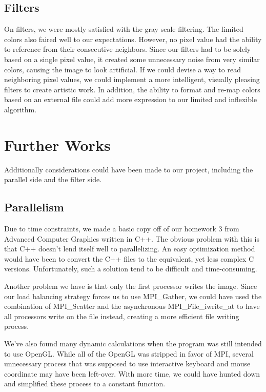 \documentclass{acmsiggraph}
\begin{document}
\subsection{Filters}
On filters, we were mostly satisfied with the gray scale filtering.  The
limited colors also faired well to our expectations. However, no pixel value had
the ability to reference from their consecutive neighbors.  Since our filters had
to be solely based on a single pixel value, it created some unnecessary noise from
very similar colors, causing the image to look artificial.  If we could devise a
way to read neighboring pixel values, we could implement a more intelligent,
visually pleasing filters to create artistic work.  In addition, the ability
to format and re-map colors based on an external file could add more expression
to our limited and inflexible algorithm.


\section{Further Works}
Additionally considerations could have been made to our project, including the
parallel side and the filter side.

\subsection{Parallelism}
Due to time constraints, we made a basic copy off of our homework 3 from
Advanced Computer Graphics written in C++.  The obvious problem with this is
that C++ doesn't lend itself well to parallelizing.  An easy optimization method
would have been to convert the C++ files to the equivalent, yet less complex C
versions.  Unfortunately, such a solution tend to be difficult and time-consuming.

Another problem we have is that only the first processor writes the image.  Since our load
balancing strategy forces us to use MPI\_Gather, we could have used the combination
of MPI\_Scatter and the asynchronous MPI\_File\_iwrite\_at to have all processors
write on the file instead, creating a more efficient file writing process.

We've also found many dynamic calculations when the program was still
intended to use OpenGL. While all of the OpenGL was stripped in favor of MPI,
several unnecessary process that was supposed to use interactive keyboard and mouse
coordinate may have been left-over.  With more time, we could have hunted down and
simplified these process to a constant function.
\end{document}
